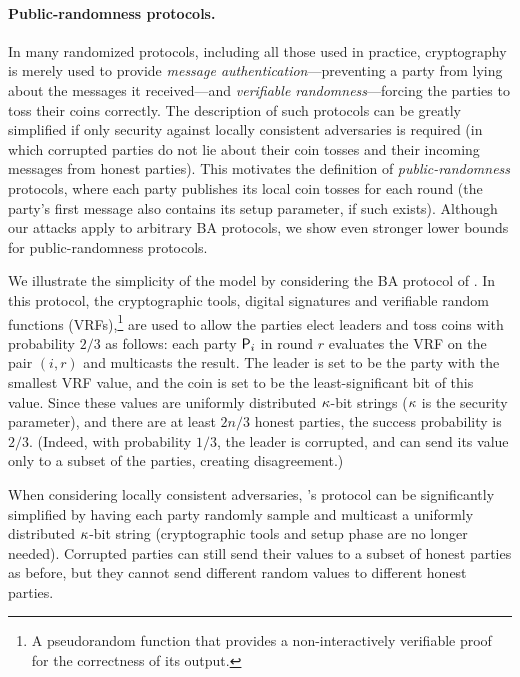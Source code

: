 \paragraph{Public-randomness protocols.}
In many randomized protocols, including all those used in practice, cryptography is merely used to provide \emph{message authentication}---preventing a party from lying about the messages it received---and \emph{verifiable randomness}---forcing the parties to toss their coins correctly. The description of such protocols can be greatly simplified if only security against locally consistent adversaries is required (in which corrupted parties do not lie about their coin tosses and their incoming messages from honest parties). This motivates the definition of \emph{public-randomness} protocols, where each party publishes its local coin tosses for each round (the party's first message also contains its setup parameter, if such exists).
Although our attacks apply to arbitrary BA protocols, we show even stronger lower bounds for public-randomness protocols.

We illustrate the simplicity of the model by considering the BA protocol of \citet{Micali17}. In this protocol, the cryptographic tools, digital signatures and verifiable random functions (VRFs),\footnote{A pseudorandom function that provides a non-interactively verifiable proof for the correctness of its output.} are used to allow the parties elect leaders and toss coins with probability $2/3$ as follows: each party $\mathsf{P}_i$ in round $r$ evaluates the VRF on the pair $(i,r)$ and multicasts the result. The leader is set to be the party with the smallest VRF value, and the coin is set to be the least-significant bit of this value. Since these values are uniformly distributed $\kappa$-bit strings ($\kappa$ is the security parameter), and there are at least $2n/3$ honest parties, the success probability is $2/3$. (Indeed, with probability $1/3$, the leader is corrupted, and can send its value only to a subset of the parties, creating disagreement.)

When considering locally consistent adversaries, \citeauthor{Micali17}'s protocol can be significantly simplified by having each party randomly sample and multicast a uniformly distributed $\kappa$-bit string (cryptographic tools and setup phase are no longer needed). Corrupted parties can still send their values to a subset of honest parties as before, but they cannot send different random values to different honest parties.

